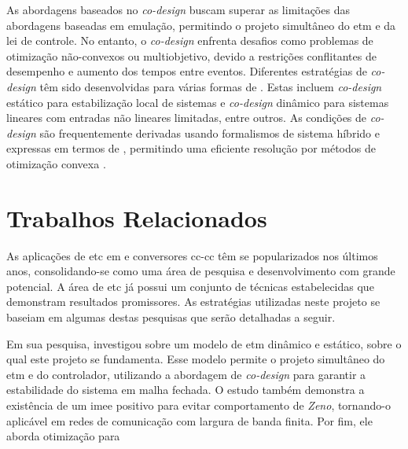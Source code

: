 As abordagens baseados no \textit{co-design} buscam superar as limitações das abordagens baseadas em emulação, permitindo o projeto simultâneo do \acrshort{etm} e da lei de controle. No entanto, o \textit{co-design} enfrenta desafios como problemas de otimização não-convexos ou multiobjetivo, devido a restrições conflitantes de desempenho e aumento dos tempos entre eventos. Diferentes estratégias de \textit{co-design} têm sido desenvolvidas para várias formas de . Estas incluem \textit{co-design} estático para estabilização local de sistemas  e \textit{co-design} dinâmico para sistemas lineares com entradas não lineares limitadas, entre outros. As condições de \textit{co-design} são frequentemente derivadas usando formalismos de sistema híbrido e expressas em termos de , permitindo uma eficiente resolução por métodos de otimização convexa \citep{coutinho2021}.

\section{Trabalhos Relacionados}

As aplicações de \acrshort{etc} em  e conversores \acrshort{cc}-\acrshort{cc} têm se popularizados nos últimos anos, consolidando-se como uma área de pesquisa e desenvolvimento com grande potencial. A área de \acrshort{etc} já possui um conjunto de técnicas estabelecidas que demonstram resultados promissores. As estratégias utilizadas neste projeto se baseiam em algumas destas pesquisas que serão detalhadas a seguir.

Em sua pesquisa, \cite{coutinho2021} investigou sobre um modelo de \acrshort{etm} dinâmico e estático, sobre o qual este projeto se fundamenta. Esse modelo permite o projeto simultâneo do \acrshort{etm} e do controlador, utilizando a abordagem de \textit{co-design} para garantir a estabilidade do sistema em malha fechada. O estudo também demonstra a existência de um \acrfull{imee} positivo para evitar comportamento de \textit{Zeno}, tornando-o aplicável em redes de comunicação com largura de banda finita. Por fim, ele aborda otimização para 

